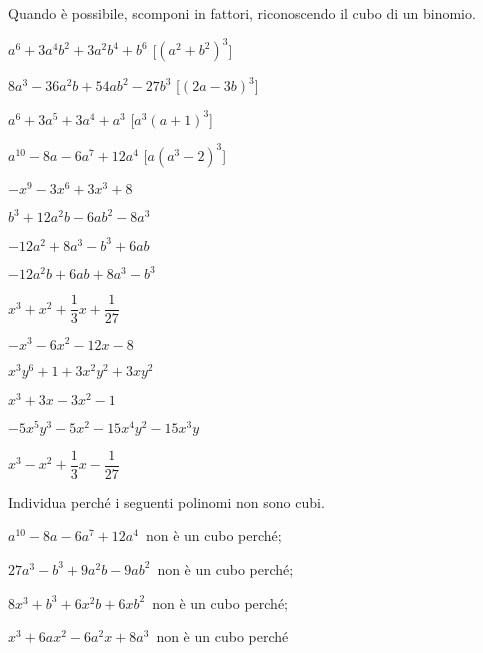 \begin{esercizio}
\label{ese:16.20}
Quando è possibile, scomponi in fattori, riconoscendo il cubo di un binomio.
\begin{multicols}{2}
\begin{enumeratea}
 \item $a^{6}+3a^{4}b^{2}+3a^{2}b^{4}+b^{6}$ 
  \hfill [$\left(a^{2}+b^{2}\right)^{3}$]
 \item $8a^{3}-36a^{2}b+54ab^{2}-27b^{3}$ 
  \hfill [$(2a-3b)^{3}$]
 \item $a^{6}+3a^{5}+3a^{4}+a^{3}$ 
  \hfill [$a^{3}(a+1)^{3}$]
 \item $a^{10}-8a-6a^{7}+12a^{4}$ 
  \hfill [$a\left(a^3-2\right)^3$]
 \item $-x^{9}-3x^{6}+3x^{3}+8$
 \item $b^{3}+12a^{2}b-6ab^{2}-8a^{3}$
 \item $-12a^{2}+8a^{3}-b^{3}+6ab$
 \item $-12a^{2}b+6ab+8a^{3}-b^{3}$
 \item $x^{3}+x^{2}+\dfrac{1}{3}x+\dfrac{1}{27}$
 \item $-x^{3}-6x^{2}-12x-8$
 \item $x^{3}y^{6}+1+3x^{2}y^{2}+3xy^{2}$
 \item $x^{3}+3x-3x^{2}-1$
 \item $-5x^{5}y^{3}-5x^{2}-15x^{4}y^{2}-15x^{3}y$
 \item $x^{3}-x^{2}+\dfrac{1}{3}x-\dfrac{1}{27}$
\end{enumeratea}
\end{multicols}
\end{esercizio}

\begin{esercizio}
\label{ese:16.24}
Individua perché i seguenti polinomi non sono cubi.
\begin{enumeratea}
 \item $a^{10}-8a-6a^{7}+12a^{4}$\, non è un cubo perché\dotfill;
 \item $27a^{3}-b^{3}+9a^{2}b-9ab^{2}$\, non è un cubo perché\dotfill;
 \item $8x^{3}+b^{3}+6x^{2}b+6{xb}^{2}$\, non è un cubo perché\dotfill;
 \item $x^{3}+6ax^{2}-6a^{2}x+8a^{3}$\, non è un cubo perché\dotfill
\end{enumeratea}
\end{esercizio}

